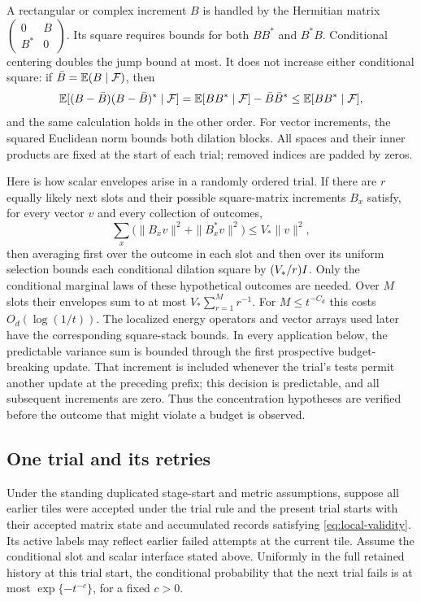 A rectangular or complex increment $B$ is handled by the Hermitian
matrix $\left(\begin{smallmatrix}0&B\\B^*&0\end{smallmatrix}\right)$.
Its square requires bounds for both $BB^*$ and $B^*B$.
Conditional centering doubles the jump bound at most. It does not
increase either conditional square: if $\bar B=\mathbb E(B\mid\mathcal F)$,
then
\[
 \mathbb E[(B-\bar B)(B-\bar B)^*\mid\mathcal F]
 =\mathbb E[BB^*\mid\mathcal F]-\bar B\bar B^*
 \le\mathbb E[BB^*\mid\mathcal F],
\]
and the same calculation holds in the other order. For vector
increments, the squared Euclidean norm bounds both dilation blocks.
All spaces and their inner products are fixed at the start of each
trial; removed indices are padded by zeros.

Here is how scalar envelopes arise in a randomly ordered trial. If
there are $r$ equally likely next slots and their possible square-matrix
increments $B_x$ satisfy, for every vector $v$ and every collection of outcomes,
\[
 \sum_x\bigl(\|B_xv\|^2+\|B_x^*v\|^2\bigr)
 \le V_*\|v\|^2,
\]
then averaging first over the outcome in each slot and then over its
uniform selection bounds each conditional dilation square by
$(V_*/r)I$. Only the conditional marginal laws of these hypothetical
outcomes are needed. Over $M$ slots their envelopes sum to at most
$V_*\sum_{r=1}^M r^{-1}$. For $M\le t^{-C_d}$ this costs
$O_d(\log(1/t))$. The localized energy operators and vector arrays used
later have the corresponding square-stack bounds.
In every application below, the
predictable variance sum is bounded through the first prospective
budget-breaking update. That increment is included whenever the trial's
tests permit another update at the preceding prefix; this decision is
predictable, and all subsequent increments are zero. Thus the concentration
hypotheses are verified
before the outcome that might violate a budget is observed.

\subsection{One trial and its retries}

\begin{lemma}\label{lem:local-trial}
Under the standing duplicated stage-start and metric assumptions,
suppose all earlier tiles were accepted under the trial rule and the
present trial starts with their accepted matrix state and accumulated
records satisfying \eqref{eq:local-validity}.  Its active labels may reflect earlier failed attempts at the
current tile.  Assume the conditional slot and scalar
interface stated above.  Uniformly in the full retained history at
this trial start, the conditional probability that the next trial fails
is at most \(\exp\{-t^{-c}\}\), for a fixed \(c>0\).
\end{lemma}

